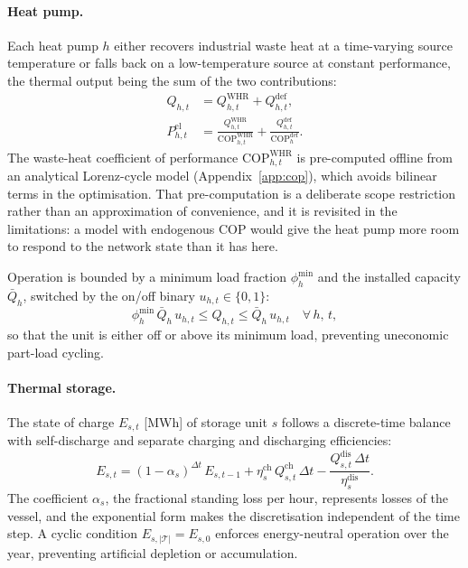 \paragraph{Heat pump.}
Each heat pump $h$ either recovers industrial waste heat at a time-varying source
temperature or falls back on a low-temperature source at constant performance, the
thermal output being the sum of the two contributions:
%
\begin{align}
  Q_{h,t} &= Q_{h,t}^{\mathrm{WHR}} + Q_{h,t}^{\mathrm{def}},
  \label{eq:hp_split} \\[4pt]
  P_{h,t}^{\mathrm{el}} &= \frac{Q_{h,t}^{\mathrm{WHR}}}{
    \mathrm{COP}_{h,t}^{\mathrm{WHR}}}
    + \frac{Q_{h,t}^{\mathrm{def}}}{\mathrm{COP}_h^{\mathrm{def}}}.
  \label{eq:hp_pel}
\end{align}
%
The waste-heat coefficient of performance $\mathrm{COP}_{h,t}^{\mathrm{WHR}}$ is
pre-computed offline from an analytical Lorenz-cycle model
(Appendix~\ref{app:cop}), which avoids bilinear terms in the optimisation. That
pre-computation is a deliberate scope restriction rather than an approximation of
convenience, and it is revisited in the limitations: a model with endogenous COP would
give the heat pump more room to respond to the network state than it has here.

Operation is bounded by a minimum load fraction $\phi_h^{\mathrm{min}}$ and the installed
capacity $\bar{Q}_h$, switched by the on/off binary $u_{h,t} \in \{0,1\}$:
%
\begin{equation}
  \phi_h^{\mathrm{min}}\, \bar{Q}_h\, u_{h,t}
  \leq Q_{h,t} \leq \bar{Q}_h\, u_{h,t}
  \quad \forall\, h,\, t,
  \label{eq:hp_cap}
\end{equation}
%
so that the unit is either off or above its minimum load, preventing uneconomic part-load
cycling.

\paragraph{Thermal storage.}
The state of charge $E_{s,t}$ [MWh] of storage unit $s$ follows a discrete-time balance
with self-discharge and separate charging and discharging efficiencies:
%
\begin{equation}
  E_{s,t} = (1 - \alpha_s)^{\Delta t}\, E_{s,t-1}
    + \eta_s^{\mathrm{ch}}\, Q_{s,t}^{\mathrm{ch}}\, \Delta t
    - \frac{Q_{s,t}^{\mathrm{dis}}\, \Delta t}{\eta_s^{\mathrm{dis}}}.
  \label{eq:storage_soc}
\end{equation}
%
The coefficient $\alpha_s$, the fractional standing loss per hour, represents losses of
the vessel, and the exponential form makes the discretisation independent of the time step.
A cyclic condition $E_{s,|\mathcal{T}|} = E_{s,0}$ enforces energy-neutral operation over
the year, preventing artificial depletion or accumulation.


